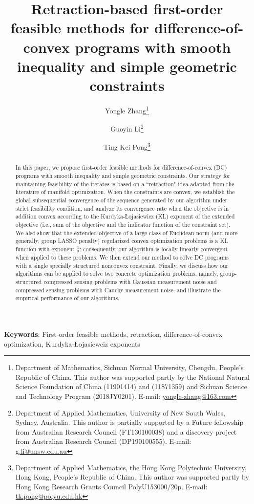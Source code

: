 \documentclass[10pt]{article}
\title{\sf Retraction-based first-order feasible methods for difference-of-convex programs with smooth inequality and simple geometric constraints}
\author{
Yongle Zhang\thanks{
        Department of Mathematics, Sichuan Normal University, Chengdu, People's Republic of China.
        This author was supported partly by the National Natural Science Foundation of China (11901414) and (11871359) and Sichuan Science and Technology Program (2018JY0201).
        E-mail: \href{yongle-zhang@163.com}{yongle-zhang@163.com}}
\and
Guoyin Li\thanks{
        Department of Applied Mathematics, University of New South Wales, Sydney, Australia.
        This author is partially supported by a Future fellowship from Australian Research Council (FT130100038) and a discovery project from Australian Research Council (DP190100555).
        E-mail: \href{g.li@unsw.edu.au}{g.li@unsw.edu.au}}
\and
Ting Kei Pong\thanks{
		Department of Applied Mathematics, the Hong Kong Polytechnic University, Hong Kong, People's Republic of China.
		This author was supported partly by Hong Kong Research Grants Council PolyU153000/20p.
		E-mail: \href{tk.pong@polyu.edu.hk}{tk.pong@polyu.edu.hk}}
}
\numberwithin{equation}{section}
\begin{document}
\maketitle

\begin{abstract}
  In this paper, we propose first-order feasible methods for difference-of-convex (DC) programs with smooth inequality and simple geometric constraints. Our strategy for maintaining feasibility of the iterates is based on a ``retraction" idea adapted from the literature of manifold optimization. When the constraints are convex, we establish the global subsequential convergence of the sequence generated by our algorithm under strict feasibility condition, and analyze its convergence rate when the objective is in addition convex according to the Kurdyka-{\L}ojasiewicz (KL) exponent of the extended objective (i.e., sum of the objective and the indicator function of the constraint set). We also show that the extended objective of a large class of Euclidean norm (and more generally, group LASSO penalty) regularized convex optimization problems is a KL function with exponent $\frac12$; consequently, our algorithm is locally linearly convergent when applied to these problems. We then extend our method to solve DC programs with a single specially structured nonconvex constraint. Finally, we discuss how our algorithms can be applied to solve two concrete optimization problems, namely, group-structured compressed sensing problems with Gaussian measurement noise and compressed sensing problems with Cauchy measurement noise, and illustrate the empirical performance of our algorithms.
\end{abstract}

{\small
{\bf Keywords}: First-order feasible methods, retraction, difference-of-convex optimization, Kurdyka-{\L}ojasiewciz exponents
}
\end{document}
